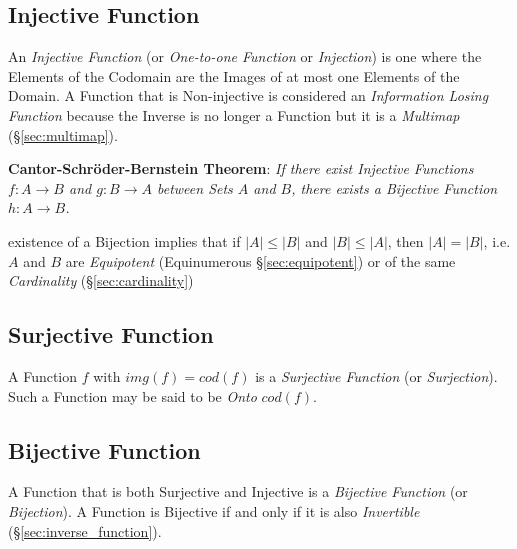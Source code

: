\subsection{Injective Function}\label{sec:injective_function}

An \emph{Injective Function} (or \emph{One-to-one Function} or \emph{Injection})
is one where the Elements of the Codomain are the Images of at most one Elements
of the Domain. A Function that is Non-injective is considered an
\emph{Information Losing Function} because the Inverse is no longer a Function
but it is a \emph{Multimap} (\S\ref{sec:multimap}).

\textbf{Cantor-Schr\"oder-Bernstein Theorem}: \emph{If there exist Injective
  Functions $f : A \to B$ and $g : B \to A$ between Sets $A$ and
  $B$, there exists a Bijective Function $h : A \to B$.}

existence of a Bijection implies that if $|A| \leq |B|$ and $|B| \leq |A|$, then
$|A| = |B|$, i.e. $A$ and $B$ are \emph{Equipotent} (Equinumerous
\S\ref{sec:equipotent}) or of the same \emph{Cardinality}
(\S\ref{sec:cardinality})



\subsection{Surjective Function}\label{sec:surjective_function}

A Function $f$ with $img(f) = cod(f)$ is a \emph{Surjective Function}
(or \emph{Surjection}). Such a Function may be said to be \emph{Onto}
$cod(f)$.



\subsection{Bijective Function}\label{sec:bijective_function}

A Function that is both Surjective and Injective is a \emph{Bijective Function}
(or \emph{Bijection}). A Function is Bijective if and only if it is also
\emph{Invertible} (\S\ref{sec:inverse_function}).

